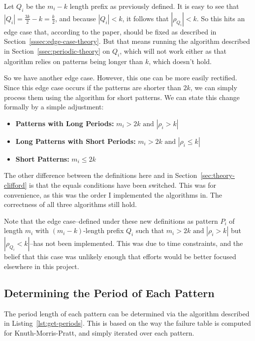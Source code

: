 \documentclass[ %
                    author={Dominic Joseph Moylett},
                    degree={MEng},
                     title={Dictionary Matching with Fingerprints},
                  subtitle={An Empirical Analysis},
                      type={Research},
                      year={2014} ]{dissertation}
\begin{document}
Let $Q_i$ be the $m_i - k$ length prefix as previously defined. It is easy to see that $|Q_i| = \frac{3k}{2} - k = \frac{k}{2}$, and because $|Q_i| < k$, it follows that $|\rho_{Q_i}| < k$. So this hits an edge case that, according to the paper, should be fixed as described in Section~\ref{sssec:edge-case-theory}. But that means running the algorithm described in Section~\ref{ssec:periodic-theory} on $Q_i$, which will not work either as that algorithm relies on patterns being longer than $k$, which doesn't hold.

So we have another edge case. However, this one can be more easily rectified. Since this edge case occurs if the patterns are shorter than $2k$, we can simply process them using the algorithm for short patterns. We can state this change formally by a simple adjustment:

\begin{itemize}
  \item \textbf{Patterns with Long Periods:} $m_i > 2k \text{ and } |\rho_i > k|$
  \item \textbf{Long Patterns with Short Periods:} $m_i > 2k \text{ and } |\rho_i \leq k|$
  \item \textbf{Short Patterns:} $m_i \leq 2k$
\end{itemize}

The other difference between the definitions here and in Section~\ref{sec:theory-clifford} is that the equals conditions have been switched. This was for convenience, as this was the order I implemented the algorithms in. The correctness of all three algorithms still hold.

Note that the edge case--defined under these new definitions as pattern $P_i$ of length $m_i$ with $(m_i - k)$-length prefix $Q_i$ such that $m_i > 2k \text{ and } |\rho_i > k|$ but $|\rho_{Q_i} < k|$--has not been implemented. This was due to time constraints, and the belief that this case was unlikely enough that efforts would be better focused elsewhere in this project.

\subsection{Determining the Period of Each Pattern}

The period length of each pattern can be determined via the algorithm described in Listing~\ref{lst:get-periods}. This is based on the way the failure table is computed for Knuth-Morris-Pratt, and simply iterated over each pattern.
\end{document}
